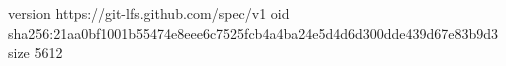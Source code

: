 version https://git-lfs.github.com/spec/v1
oid sha256:21aa0bf1001b55474e8eee6c7525fcb4a4ba24e5d4d6d300dde439d67e83b9d3
size 5612
